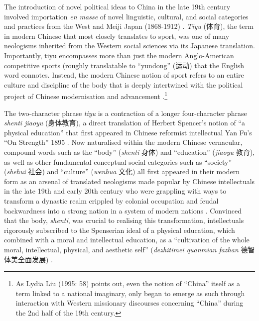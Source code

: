 \begin{CJK}{UTF8}{gbsn}
The introduction of novel political ideas to China in the late 19th century involved importation \textit{en masse} of novel linguistic, cultural, and social categories and practices from the West and Meiji Japan (1868-1912) \citep{Liu1995}. \textit{Tiyu} (体育), the term in modern Chinese that most closely translates to sport, was one of many neologisms inherited from the Western social sciences via its Japanese translation.  Importantly, tiyu encompasses more than just the modern Anglo-American competitive sports (roughly translatable to ``yundong'' (运动) that the English word connotes.  Instead, the modern Chinese notion of sport refers to an entire culture and discipline of the body that is deeply intertwined with the political project of Chinese modernisation and advancement \citep{Morris2004}.\footnote{As Lydia Liu (1995: 58) points out, even the notion of ``China'' itself as a term linked to a national imaginary, only began to emerge as such through interaction with Western missionary discourses concerning ``China'' during the 2nd half of the 19th century.}

The two-character phrase \textit{tiyu} is a contraction of a longer four-character phrase \textit{shenti jiaoyu} (身体教育), a direct translation of Herbert Spencer’s notion of  ``a physical education'' that first appeared in Chinese reformist intellectual Yan Fu’s ``On Strength'' 1895 \citep[9-10]{Morris2004}.  Now naturalised within the modern Chinese vernacular, compound words such as the ``body'' (\textit{shenti} 身体) and ``education'' (\textit{jiaoyu} 教育), as well as other fundamental conceptual social categories such as ``society'' (\textit{shehui} 社会) and ``culture'' (\textit{wenhua} 文化) all first appeared in their modern form as an arsenal of translated neologisms made popular by Chinese intellectuals in the late 19th and early 20th century who were grappling with ways to transform a dynastic realm crippled by colonial occupation and feudal backwardness into a strong nation in a system of modern nations \citep{Pusey1983;Liu1995;Huters2005}.   Convinced that the body, \textit{shenti}, was crucial to realising this transformation, intellectuals rigorously subscribed to the Spenserian ideal of a physical education, which combined with a moral and intellectual education, as a ``cultivation of the whole moral, intellectual, physical, and aesthetic self'' (\textit{dezhitimei quanmian fazhan} 德智体美全面发展) \citep[10]{Morris2004}.


\end{CJK}
